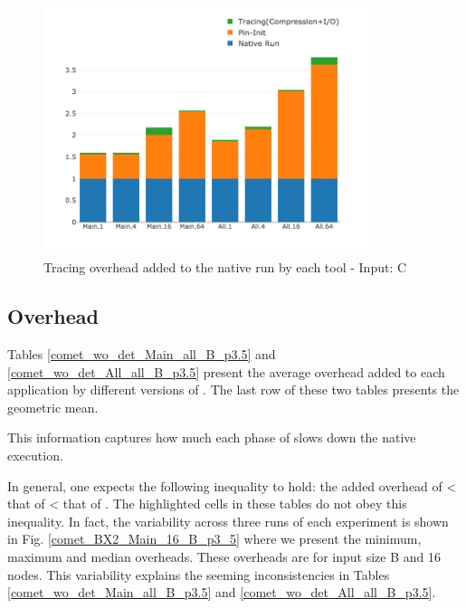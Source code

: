 \begin{figure}[t]
\centering
\includegraphics[width=3.8in]{figs.comet.newMed/comet_chartDet_C_wc_byTool_p3_5.png}
\caption{ Tracing overhead added to the native run by each tool - Input: C}
\label{comet_chartDet_C_wc_byTool_p3_5}
\end{figure}




  
  
\subsection{ \pininit Overhead} 
\label{subsec:pinit}
Tables \ref{comet_wo_det_Main_all_B_p3.5} and
\ref{comet_wo_det_All_all_B_p3.5} present the average overhead added to each
application by different versions of \parlot. 
%
The last row of these two tables
presents the geometric mean.

%
This information captures how much each
phase of \parlot slows down the native execution. 





In general, one 
expects the following inequality to hold:
 the added overhead of \pininit < that of \parlot
< that of \parlotnc. 
%
The highlighted cells in these tables do not
obey this inequality.
%
In fact, the variability across three runs of each experiment
is shown in Fig. \ref{comet_BX2_Main_16_B_p3_5}
where we present the minimum, maximum and median overheads.
%
These
overheads are for input size B and 16 nodes. 
%
This variability explains the seeming inconsistencies in  Tables
\ref{comet_wo_det_Main_all_B_p3.5} and
\ref{comet_wo_det_All_all_B_p3.5}.


